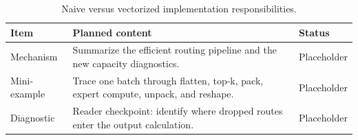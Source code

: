 \begin{table}[H]
\centering
\caption{Naive versus vectorized implementation responsibilities.}
\label{tab:ch06-chapter-summary-and-handoff}
\begin{tabularx}{\textwidth}{p{}X p{}}
\toprule
Item & Planned content & Status \\
\midrule
Mechanism & Summarize the efficient routing pipeline and the new capacity diagnostics. & Placeholder \\
Mini-example & Trace one batch through flatten, top-k, pack, expert compute, unpack, and reshape. & Placeholder \\
Diagnostic & Reader checkpoint: identify where dropped routes enter the output calculation. & Placeholder \\
\bottomrule
\end{tabularx}
\end{table}
